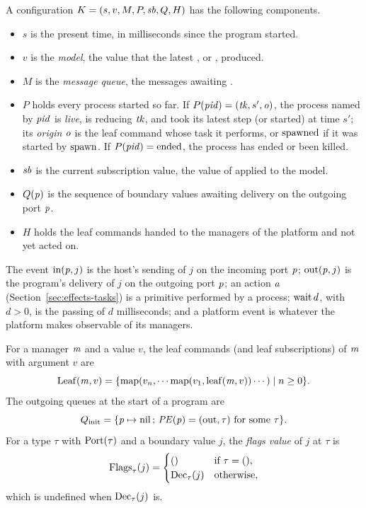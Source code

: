 A configuration $K=(s,v,M,P,\mathit{sb},Q,H)$ has the following components.
\begin{itemize}
\item $s$ is the present time, in milliseconds since the program started.
\item $v$ is the \emph{model}, the value that the latest , or
  , produced.
\item $M$ is the \emph{message queue}, the messages awaiting .
\item $P$ holds every process started so far. If
  $P(\mathit{pid})=(\mathit{tk},s',\mathit{o})$, the process named by $\mathit{pid}$ is \emph{live}, is
  reducing $\mathit{tk}$, and took its latest step (or started) at time $s'$; its
  \emph{origin} $\mathit{o}$ is the leaf command whose task it performs, or
  $\mathrm{spawned}$ if it was started by $\mathrm{spawn}$. If $P(\mathit{pid})=\mathrm{ended}$, the
  process has ended or been killed.
\item $\mathit{sb}$ is the current subscription value, the value of
   applied to the model.
\item $Q(\mathit{p})$ is the sequence of boundary values awaiting delivery on the
  outgoing port $\mathit{p}$.
\item $H$ holds the leaf commands handed to the managers of the platform and
  not yet acted on.
\end{itemize}
The event $\mathrm{in}(\mathit{p},j)$ is the host's sending of $j$ on the incoming port
$\mathit{p}$; $\mathrm{out}(\mathit{p},j)$ is the program's delivery of $j$ on the outgoing
port $\mathit{p}$; an action $\mathit{a}$ (Section~\ref{sec:effects-tasks}) is a
primitive performed by a process; $\mathrm{wait}\,d$, with $d>0$, is the passing of
$d$ milliseconds; and a platform event is whatever the platform makes
observable of its managers.

For a manager $\mathit{m}$ and a value $v$, the leaf commands (and leaf
subscriptions) of $\mathit{m}$ with argument $v$ are
\[
  \mathrm{Leaf}(\mathit{m},v)=\{\mathrm{map}(v_n,\cdots\mathrm{map}(v_1,\mathrm{leaf}(\mathit{m},v))\cdots)
    \mid n\geq 0\} .
\]
The outgoing queues at the start of a program are
\[
  \pgQinit=\{\effp\mapsto\pgnil\,;\,\PE(\effp)=(\smdirout,\tau)\ \text{for some}\ \tau\} .
\]
For a type $\tau$ with $\mathrm{Port}(\tau)$ and a boundary value $j$, the \emph{flags
value} of $j$ at $\tau$ is
\[
  \mathrm{Flags}_{\tau}(j)=\begin{cases}
    () & \text{if}\ \tau=\mathtt{()},\\
    \mathrm{Dec}_{\tau}(j) & \text{otherwise},
  \end{cases}
\]
which is undefined when $\mathrm{Dec}_{\tau}(j)$ is. %

